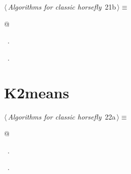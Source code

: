 \documentclass[12pt]{report}
\begin{document}
\begin{flushleft} \small
\begin{minipage}{\linewidth}\label{scrap10}\raggedright\small
{} $\langle\,${\itshape Algorithms for classic horsefly}\nobreak\ {\footnotesize {21b}}$\,\rangle\equiv$
\vspace{-1ex}
\begin{list}{}{} \item
\mbox{}\verb@   @\\
\mbox{}\verb@@{\NWsep}
\end{list}
\vspace{-1.5ex}
\footnotesize
\begin{list}{}{\setlength{\itemsep}{-\parsep}\setlength{\itemindent}{-\leftmargin}}
\item \NWtxtMacroDefBy\ .
\item \NWtxtMacroRefIn\ .

\item{}
\end{list}
\end{minipage}\vspace{4ex}
\end{flushleft}
\section{ K2means} \blindtext 
\begin{flushleft} \small
\begin{minipage}{\linewidth}\label{scrap11}\raggedright\small
{} $\langle\,${\itshape Algorithms for classic horsefly}\nobreak\ {\footnotesize {22a}}$\,\rangle\equiv$
\vspace{-1ex}
\begin{list}{}{} \item
\mbox{}\verb@   @\\
\mbox{}\verb@@{\NWsep}
\end{list}
\vspace{-1.5ex}
\footnotesize
\begin{list}{}{\setlength{\itemsep}{-\parsep}\setlength{\itemindent}{-\leftmargin}}
\item \NWtxtMacroDefBy\ .
\item \NWtxtMacroRefIn\ .

\item{}
\end{list}
\end{minipage}\vspace{4ex}
\end{flushleft}
\end{document}
